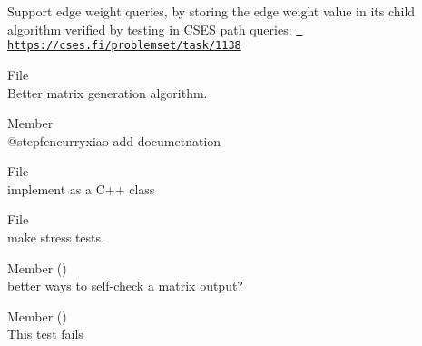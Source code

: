 \begin{DoxyRefList}
\label{todo__todo000011}%
%
Support edge weight queries, by storing the edge weight value in it\textquotesingle{}s child algorithm verified by testing in CSES path queries\+: \href{https://cses.fi/problemset/task/1138}{\texttt{ https\+://cses.\+fi/problemset/task/1138}}  
\item[File \doxylink{hill__cipher_8cpp}{hill\+\_\+cipher.cpp} ]\hfill \\
\label{todo__todo000001}%
%
Better matrix generation algorithm. 
\item[Member \doxylink{matrix__exponentiation_8cpp_a9977ad12548c4a49dee9dc3f0685aa54}{mat\+\_\+size} ]\hfill \\
\label{todo__todo000007}%
%
@stepfencurryxiao add documetnation  
\item[File \doxylink{paranthesis__matching_8cpp}{paranthesis\+\_\+matching.cpp} ]\hfill \\
\label{todo__todo000009}%
%
implement as a C++ class  
\item[File \doxylink{data__structures_2sparse__table_8cpp}{sparse\+\_\+table.cpp} ]\hfill \\
\label{todo__todo000004}%
%
make stress tests. 
\item[Member \doxylink{lu__decompose_8cpp_a1440a7779ac56f47a3f355ce4a8c7da0}{test1} ()]\hfill \\
\label{todo__todo000006}%
%
better ways to self-\/check a matrix output?  
\item[Member \doxylink{smallest__circle_8cpp_a6d0455dd5c30adda100e95f0423c786e}{test3} ()]\hfill \\
\label{todo__todo000010}%
%
This test fails 
\end{DoxyRefList}